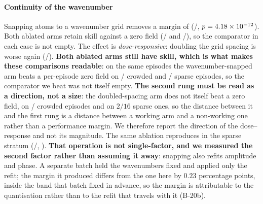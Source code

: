 \documentclass[review]{elsarticle}
\begin{document}
\paragraph{Continuity of the wavenumber}
Snapping atoms to a wavenumber grid removes a margin of \BSixteenRel{}
(\BSixteenBetter{}/\BSixteenN{}, $p = 4.18\times 10^{-12}{}$). Both ablated arms retain skill against a zero field (\BSixteenCmpZero{}/\BSixteenN{} and \BNineteenCmpZero{}/\BNineteenN{}), so the comparator in each case is not empty. The effect is
\emph{dose-responsive}: doubling the grid spacing is worse again
(\BSixteenDose{}/\BSixteenN{}).
\textbf{Both ablated arms still have skill, which is what makes these comparisons
readable}: on the same episodes the wavenumber-snapped arm beats a per-episode zero
field on \BSixteenCmpZero{}/\BSixteenN{} crowded and \BNineteenCmpZero{}/\BNineteenN{}
sparse episodes, so the comparator we beat was not itself empty.
\textbf{The second rung must be read as a direction, not a size}: the
doubled-spacing arm does not itself beat a zero field, on
\BSixteenDoseCmpZero{}/\BSixteenN{} crowded episodes and on $2/16$ sparse ones, so
the distance between it and the first rung is a distance between a working arm and a
non-working one rather than a performance margin. We therefore report the direction
of the dose--response and not its magnitude. The same ablation reproduces in the sparse stratum
(\BNineteenBetter{}/\BNineteenN{}, \BNineteenRel{}).
\textbf{That operation is not single-factor, and we measured the second factor rather
than assuming it away}: snapping also refits amplitude and phase. A separate batch held
the wavenumbers fixed and applied only the refit; the margin it produced differs from
the one here by $0.23$ percentage points, inside the band that batch fixed in advance,
so the margin is attributable to the quantisation rather than to the refit that
travels with it (B-20b).
\end{document}
